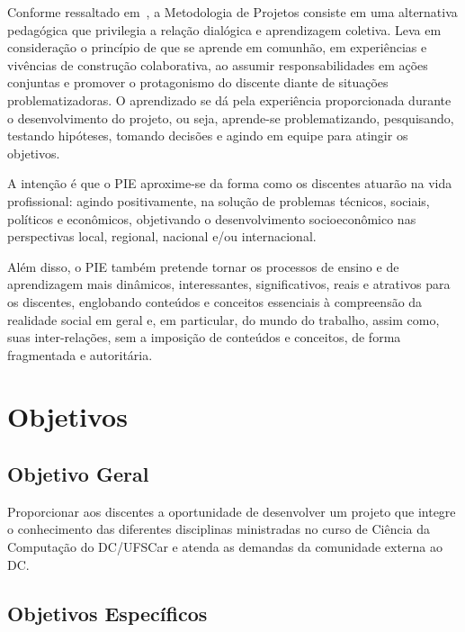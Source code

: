 \documentclass[11pt,a4paper]{report}
\begin{document}
Conforme ressaltado em~\cite{SENAC}, a Metodologia de Projetos consiste em uma alternativa pedagógica que privilegia a relação dialógica e aprendizagem coletiva. Leva em consideração o princípio de que se aprende em comunhão, em experiências e vivências de construção colaborativa, ao assumir responsabilidades em ações conjuntas e promover o protagonismo do discente diante de situações problematizadoras. O aprendizado se dá pela experiência proporcionada durante o desenvolvimento do projeto, ou seja, aprende-se problematizando, pesquisando, testando hipóteses, tomando decisões e agindo em equipe para atingir os objetivos.

A intenção é que o PIE aproxime-se da forma como os discentes atuarão na vida profissional: agindo positivamente, na solução de problemas técnicos, sociais, políticos e econômicos, objetivando o desenvolvimento socioeconômico nas perspectivas local, regional, nacional e/ou internacional.

Além disso, o PIE também pretende tornar os processos de ensino e de
aprendizagem mais dinâmicos, interessantes, significativos, reais e atrativos para os discentes, englobando conteúdos e conceitos essenciais à compreensão da realidade social em geral e, em particular, do mundo do trabalho, assim como, suas inter-relações, sem a imposição de conteúdos e conceitos, de forma fragmentada e autoritária.

\section{Objetivos}

\subsection{Objetivo Geral}

Proporcionar aos discentes a oportunidade de desenvolver um projeto que integre o conhecimento das diferentes disciplinas ministradas no curso de Ciência da Computação do DC/UFSCar e atenda as demandas da comunidade externa ao DC.

\subsection{Objetivos Específicos}
\end{document}
